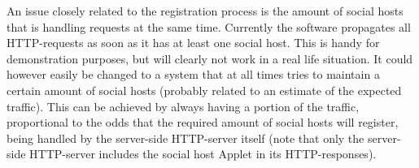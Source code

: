 \documentclass[a4paper, 10pt]{article}
\begin{document}
An issue closely related to the registration process is the amount of social hosts that is handling requests at the same time. Currently the software propagates all HTTP-requests as soon as it has at least one social host. This is handy for demonstration purposes, but will clearly not work in a real life situation. It could however easily be changed to a system that at all times tries to maintain a certain amount of social hosts (probably related to an estimate of the expected traffic). This can be achieved by always having a portion of the traffic, proportional to the odds that the required amount of social hosts will register, being handled by the server-side HTTP-server itself (note that only the server-side HTTP-server includes the social host Applet in its HTTP-responses).
\end{document}
